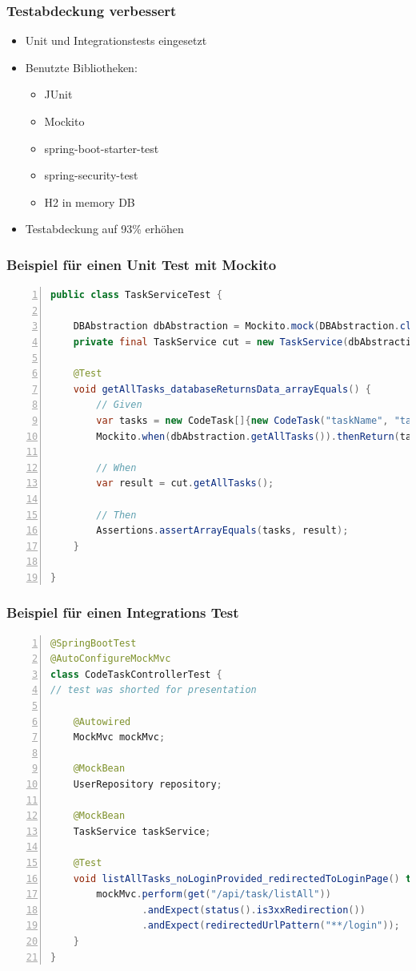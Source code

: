 \begin{frame}
\frametitle{Testabdeckung verbessert}
\begin{itemize}
\item Unit und Integrationstests eingesetzt
\item Benutzte Bibliotheken:
\begin{itemize}
\item JUnit
\item Mockito
\item spring-boot-starter-test
\item spring-security-test
\item H2 in memory DB
\end{itemize}
\item Testabdeckung auf 93\% erhöhen
\end{itemize}
\end{frame}

\begin{frame}[containsverbatim]
\frametitle{Beispiel für einen Unit Test mit Mockito}
\begin{shaded}
\begin{lstlisting}[language=Java, basicstyle=\tiny, numbers=left]
public class TaskServiceTest {

    DBAbstraction dbAbstraction = Mockito.mock(DBAbstraction.class);
    private final TaskService cut = new TaskService(dbAbstraction);

    @Test
    void getAllTasks_databaseReturnsData_arrayEquals() {
        // Given
        var tasks = new CodeTask[]{new CodeTask("taskName", "taskDesc", "psvm")};
        Mockito.when(dbAbstraction.getAllTasks()).thenReturn(tasks);

        // When
        var result = cut.getAllTasks();

        // Then
        Assertions.assertArrayEquals(tasks, result);
    }

}
\end{lstlisting}
\end{shaded}
\end{frame}


\begin{frame}[containsverbatim]
\frametitle{Beispiel für einen Integrations Test}
\begin{shaded}
\begin{lstlisting}[language=Java, basicstyle=\tiny, numbers=left]
@SpringBootTest
@AutoConfigureMockMvc
class CodeTaskControllerTest {
// test was shorted for presentation

    @Autowired
    MockMvc mockMvc;

    @MockBean
    UserRepository repository;

    @MockBean
    TaskService taskService;

    @Test
    void listAllTasks_noLoginProvided_redirectedToLoginPage() throws Exception {
        mockMvc.perform(get("/api/task/listAll"))
                .andExpect(status().is3xxRedirection())
                .andExpect(redirectedUrlPattern("**/login"));
    }
}
\end{lstlisting}
\end{shaded}
\end{frame}


